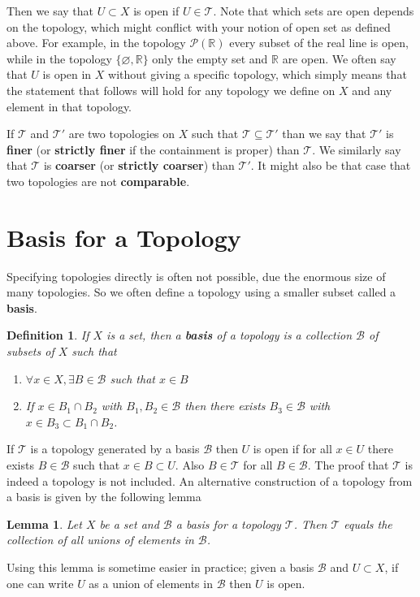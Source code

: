 \documentclass{article}
\newcommand{\Ba}{\mathcal{B}}
\newcommand{\Ta}{\mathcal{T}}
\newcommand{\R}{\mathbb{R}}
\newtheorem{lemma}[theorem]{Lemma}
\newtheorem*{definition}{Definition}
\theoremstyle{remark}
\begin{document}
Then we say that $U\subset X$ is open if $U\in\Ta$. 
Note that which sets are open depends on the topology, which might conflict with your notion of open set as defined above. 
For example, in the topology $\mathcal{P}(\R)$ every subset of the real line is open, while in the topology $\{\varnothing, \R\}$ only the empty set and $\R$ are open.
We often say that $U$ is open in $X$ without giving a specific topology, which simply means that the statement that follows will hold for any topology we define on $X$ and any element in that topology.

If $\Ta$ and $\Ta'$ are two topologies on $X$ such that $\Ta\subseteq\Ta'$ than we say that $\Ta'$ is \textbf{finer} (or \textbf{strictly finer} if the containment is proper) than $\Ta$. 
We similarly say that $\Ta$ is \textbf{coarser} (or \textbf{strictly coarser}) than $\Ta'$.
It might also be that case that two topologies are not \textbf{comparable}.

\section{Basis for a Topology}
Specifying topologies directly is often not possible, due the enormous size of many topologies.
So we often define a topology using a smaller subset called a \textbf{basis}.
\begin{definition}
    If $X$ is a set, then a \textbf{basis} of a topology is a collection $\mathcal{B}$ of subsets of $X$ such that
    \begin{enumerate}
        \item $\forall x\in X, \exists B\in\mathcal{B}$ such that $x\in B$
        \item If $x\in B_1\cap B_2$ with $B_1,B_2\in\mathcal{B}$ then there exists $B_3\in\mathcal{B}$ with $x\in B_3\subset B_1\cap B_2$.
    \end{enumerate}
\end{definition}
If $\Ta$ is a topology generated by a basis $\Ba$ then $U$ is open if for all $x\in U$ there exists $B\in\Ba$ such that $x\in B\subset U$. 
Also $B\in\Ta$ for all $B\in\Ba$. The proof that $\Ta$ is indeed a topology is not included.
An alternative construction of a topology from a basis is given by the following lemma
\begin{lemma}
    Let $X$ be a set and $\Ba$ a basis for a topology $\Ta$. Then $\Ta$ equals the collection of all unions of elements in $\Ba$.
\end{lemma}
Using this lemma is sometime easier in practice; given a basis $\Ba$ and $U\subset X$, if one can write $U$ as a union of elements in $\Ba$ then $U$ is open.
\end{document}
